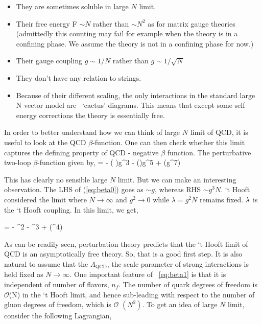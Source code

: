 \vspace{5mm}

\begin{itemize}
\item They are sometimes soluble in large $N$ limit. 
\item Their free energy F $\sim N$ rather than $\sim N^2$ as for matrix gauge theories (admittedly this counting 
may fail for example when the theory is in a confining phase. We assume the theory is not in a confining phase for now.)
\item Their gauge coupling $g \sim 1/N$ rather than $g \sim 1/\sqrt{N}$
\item They don't have any relation to strings. 
\item Because of their different scaling, the only interactions in the standard large N vector model are ~`cactus' diagrams. 
This means that except some self energy corrections the theory is essentially free. 
\end{itemize} 

In order to better understand how we can think of large $N$ limit of QCD, it is useful to look at the QCD $\beta$-function. 
One can then check whether this limit captures the defining property of QCD - negative $\beta$ function. The perturbative 
two-loop $\beta$-function given by, 
\beq
\label{eq:beta0}
\mu {} = -  \left ( \right)g^3  -  \left (\right)g^5 + (g^7)
\eeq

This has clearly no sensible large $N$ limit. But we can make an interesting observation. The LHS of (\ref{eq:beta0}) goes as 
$ \sim g$, whereas RHS $ \sim g^3 N$. `t Hooft considered the limit where $N \to \infty$ and $g^2 \to 0$ while $\lambda = g^2 N $ 
remains fixed. $\lambda$ is the `t Hooft coupling. In this limit, we get, 

\beq
  \label{eq:beta1}
\mu {} = -  \lambda^2 -   \lam^3 + (\lambda^4) 
\eeq

As can be readily seen, perturbation theory predicts that the `t Hooft limit of QCD is an asymptotically free
theory. So, that is a good first step. It is also natural to assume that the $\Lambda_{\text{QCD}}$, 
the scale parameter of strong interactions is held fixed as $N \to \infty$. One important feature of ~\ref{eq:beta1} 
is that it is independent of number of flavors, $n_{f}$. The 
number of quark degrees of freedom is $\mathscr{O}$(N) in the
`t Hooft limit, and hence sub-leading with respect to the number of gluon degrees of freedom, which is $\mathscr{O}$ $(N^{2})$. 
To get an idea of large $N$ limit, consider the following Lagrangian, 

